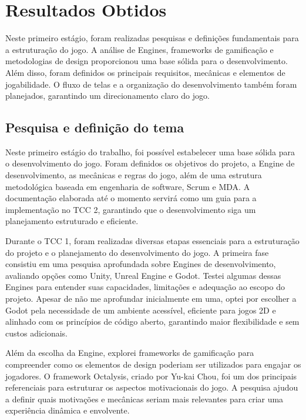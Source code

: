 \chapter[Resultados Obtidos]{Resultados Obtidos}

Neste primeiro estágio, foram realizadas pesquisas e definições fundamentais para a estruturação do jogo. A análise de Engines, frameworks de gamificação e metodologias de design proporcionou uma base sólida para o desenvolvimento. Além disso, foram definidos os principais requisitos, mecânicas e elementos de jogabilidade. O fluxo de telas e a organização do desenvolvimento também foram planejados, garantindo um direcionamento claro do jogo.

\section{Pesquisa e definição do tema}

Neste primeiro estágio do trabalho, foi possível estabelecer uma base sólida para o desenvolvimento do jogo. Foram definidos os objetivos do projeto, a Engine de desenvolvimento, as mecânicas e regras do jogo, além de uma estrutura metodológica baseada em engenharia de software, Scrum e MDA. A documentação elaborada até o momento servirá como um guia para a implementação no TCC 2, garantindo que o desenvolvimento siga um planejamento estruturado e eficiente.

Durante o TCC 1, foram realizadas diversas etapas essenciais para a estruturação do projeto e o planejamento do desenvolvimento do jogo. A primeira fase consistiu em uma pesquisa aprofundada sobre Engines de desenvolvimento, avaliando opções como Unity, Unreal Engine e Godot. Testei algumas dessas Engines para entender suas capacidades, limitações e adequação ao escopo do projeto. Apesar de não me aprofundar inicialmente em uma, optei por escolher a Godot pela necessidade de um ambiente acessível, eficiente para jogos 2D e alinhado com os princípios de código aberto, garantindo maior flexibilidade e sem custos adicionais.

Além da escolha da Engine, explorei frameworks de gamificação para compreender como os elementos de design poderiam ser utilizados para engajar os jogadores. O framework Octalysis, criado por Yu-kai Chou, foi um dos principais referenciais para estruturar os aspectos motivacionais do jogo. A pesquisa ajudou a definir quais motivações e mecânicas seriam mais relevantes para criar uma experiência dinâmica e envolvente.

